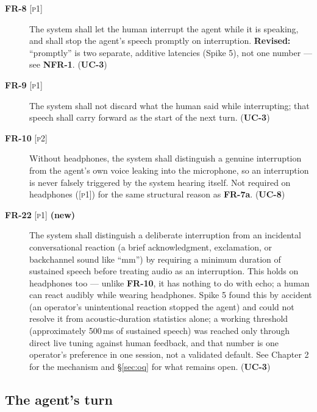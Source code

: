 \documentclass[a4paper,11pt]{report}
\newcommand{\uc}[1]{\textbf{UC-#1}}
\newcommand{\fr}[1]{\textbf{FR-#1}}
\newcommand{\nfr}[1]{\textbf{NFR-#1}}
\newcommand{\pone}{\textsc{[p1]}}
\newcommand{\ptwo}{\textsc{[p2]}}
\begin{document}
\begin{description}
  \item[\fr{8} \pone{}] The system shall let the human interrupt the agent
    while it is speaking, and shall stop the agent's speech promptly on
    interruption. \textbf{Revised:} ``promptly'' is two separate,
    additive latencies (Spike 5), not one number --- see \nfr{1}.
    (\uc{3})
  \item[\fr{9} \pone{}] The system shall not discard what the human said
    while interrupting; that speech shall carry forward as the start of
    the next turn. (\uc{3})
  \item[\fr{10} \ptwo{}] Without headphones, the system shall distinguish
    a genuine interruption from the agent's own voice leaking into the
    microphone, so an interruption is never falsely triggered by the
    system hearing itself. Not required on headphones (\pone{}) for the
    same structural reason as \fr{7a}. (\uc{8})
  \item[\fr{22} \pone{} \textbf{(new)}] The system shall distinguish a
    deliberate interruption from an incidental conversational reaction
    (a brief acknowledgment, exclamation, or backchannel sound like
    ``mm'') by requiring a minimum duration of sustained speech before
    treating audio as an interruption. This holds on headphones too ---
    unlike \fr{10}, it has nothing to do with echo; a human can react
    audibly while wearing headphones. Spike 5 found this by accident (an
    operator's unintentional reaction stopped the agent) and could not
    resolve it from acoustic-duration statistics alone; a working
    threshold (approximately 500\,ms of sustained speech) was reached
    only through direct live tuning against human feedback, and that
    number is one operator's preference in one session, not a validated
    default. See Chapter 2 for the mechanism and \S\ref{sec:oq} for what
    remains open. (\uc{3})
\end{description}

\subsection{The agent's turn}
\end{document}
